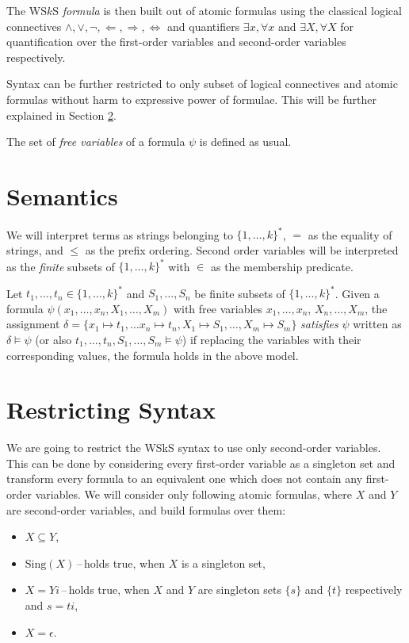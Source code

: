 The WS$k$S \emph{formula} is then built out of atomic formulas using the classical logical connectives $\wedge, \vee, \neg, \Leftarrow, \Rightarrow, \Leftrightarrow$ and quantifiers $\exists x, \forall x$ and $\exists X, \forall X$ for quantification over the first-order variables and second-order variables respectively.

Syntax can be further restricted to only subset of logical connectives and atomic formulas without harm to expressive power of formulae. This will be further explained in Section \ref{restricted}.

The set of \emph{free variables} of a formula $\psi$ is defined as usual.
  
  \section{Semantics}
	
	We will interpret terms as strings belonging to $\{1,\ldots,k\}^*$, $=$ as the equality of strings, and $\leq$ as the prefix ordering. Second order variables will be interpreted as the \emph{finite} subsets of $\{1,\ldots,k\}^*$ with $\in$ as the membership predicate.
	
	Let $t_1,\ldots,t_n \in \{1,\ldots,k\}^*$ and $S_1,\ldots,S_n$ be finite subsets of $\{1,\ldots,k\}^*$. Given a formula $\psi(x_1,\ldots,x_n,X_1,\ldots,X_m)$ with free variables $x_1,\ldots,x_n$, $X_n,\ldots,X_m$, the assignment $\delta = \{ x_1 \mapsto t_1,\ldots x_n \mapsto t_n, X_1 \mapsto S_1,\ldots, X_m \mapsto S_m\}$ \emph{satisfies} $\psi$ written as $\delta \vDash \psi$ (or also $t_1,\ldots, t_n, S_1,\ldots,S_m \vDash \psi$) if replacing the variables with their corresponding values, the formula holds in the above model.
	
  \section{Restricting Syntax}\label{restricted}
	We are going to restrict the WSkS syntax to use only second-order variables. This can be done by considering every first-order variable as a singleton set and transform every formula to an equivalent one which does not contain any first-order variables. We will consider only following atomic formulas, where $X$ and $Y$ are second-order variables, and build formulas over them:
	\begin{itemize}
	 \item $X \subseteq Y$,
	 \item $\text{Sing}(X)$\,--\,holds true, when $X$ is a singleton set,
	 \item $X = Yi$\,--\,holds true, when $X$ and $Y$ are singleton sets $\{s\}$ and $\{t\}$ respectively and $s = ti$,
	 \item $X = \epsilon$.
	\end{itemize}
	

